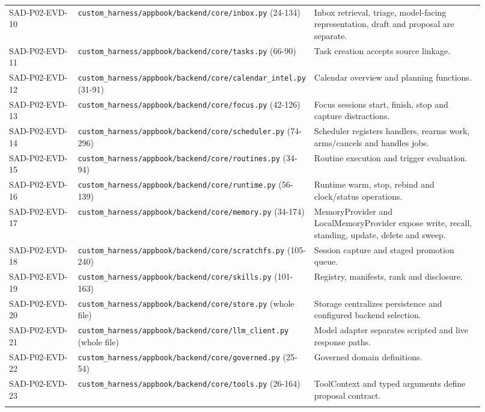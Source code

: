 \documentclass[10pt,letterpaper]{article}
\begin{document}
\begin{longtable}{@{}>{\raggedright\arraybackslash}p{0.17\linewidth}>{\raggedright\arraybackslash}p{0.34\linewidth}>{\raggedright\arraybackslash}p{0.41\linewidth}@{}}
SAD-P02-EVD-10 & \nolinkurl{custom_harness/appbook/backend/core/inbox.py} (24-134) & Inbox retrieval, triage, model-facing representation, draft and proposal are separate.\\\addlinespace
SAD-P02-EVD-11 & \nolinkurl{custom_harness/appbook/backend/core/tasks.py} (66-90) & Task creation accepts source linkage.\\\addlinespace
SAD-P02-EVD-12 & \nolinkurl{custom_harness/appbook/backend/core/calendar_intel.py} (31-91) & Calendar overview and planning functions.\\\addlinespace
SAD-P02-EVD-13 & \nolinkurl{custom_harness/appbook/backend/core/focus.py} (42-126) & Focus sessions start, finish, stop and capture distractions.\\\addlinespace
SAD-P02-EVD-14 & \nolinkurl{custom_harness/appbook/backend/core/scheduler.py} (74-296) & Scheduler registers handlers, rearms work, arms/cancels and handles jobs.\\\addlinespace
SAD-P02-EVD-15 & \nolinkurl{custom_harness/appbook/backend/core/routines.py} (34-94) & Routine execution and trigger evaluation.\\\addlinespace
SAD-P02-EVD-16 & \nolinkurl{custom_harness/appbook/backend/core/runtime.py} (56-139) & Runtime warm, stop, rebind and clock/status operations.\\\addlinespace
SAD-P02-EVD-17 & \nolinkurl{custom_harness/appbook/backend/core/memory.py} (34-174) & MemoryProvider and LocalMemoryProvider expose write, recall, standing, update, delete and sweep.\\\addlinespace
SAD-P02-EVD-18 & \nolinkurl{custom_harness/appbook/backend/core/scratchfs.py} (105-240) & Session capture and staged promotion queue.\\\addlinespace
SAD-P02-EVD-19 & \nolinkurl{custom_harness/appbook/backend/core/skills.py} (101-163) & Registry, manifests, rank and disclosure.\\\addlinespace
SAD-P02-EVD-20 & \nolinkurl{custom_harness/appbook/backend/core/store.py} (whole file) & Storage centralizes persistence and configured backend selection.\\\addlinespace
SAD-P02-EVD-21 & \nolinkurl{custom_harness/appbook/backend/core/llm_client.py} (whole file) & Model adapter separates scripted and live response paths.\\\addlinespace
SAD-P02-EVD-22 & \nolinkurl{custom_harness/appbook/backend/core/governed.py} (25-54) & Governed domain definitions.\\\addlinespace
SAD-P02-EVD-23 & \nolinkurl{custom_harness/appbook/backend/core/tools.py} (26-164) & ToolContext and typed arguments define proposal contract.\\\addlinespace

\end{longtable}
\end{document}
